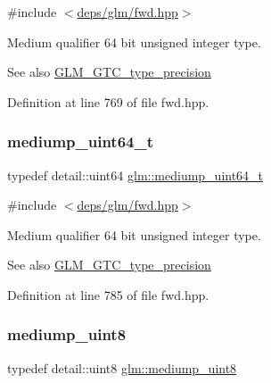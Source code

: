 {\ttfamily \#include $<$\hyperlink{fwd_8hpp}{deps/glm/fwd.\+hpp}$>$}

Medium qualifier 64 bit unsigned integer type. \begin{DoxySeeAlso}{See also}
\hyperlink{group__gtc__type__precision}{G\+L\+M\+\_\+\+G\+T\+C\+\_\+type\+\_\+precision} 
\end{DoxySeeAlso}


Definition at line 769 of file fwd.\+hpp.

\mbox{\label{group__gtc__type__precision_gaa97354d3120a6dc029a5e9563723de18}} 
\subsubsection{\texorpdfstring{mediump\+\_\+uint64\+\_\+t}{mediump\_uint64\_t}}
{\footnotesize\ttfamily typedef detail\+::uint64 \hyperlink{group__gtc__type__precision_gaa97354d3120a6dc029a5e9563723de18}{glm\+::mediump\+\_\+uint64\+\_\+t}}



{\ttfamily \#include $<$\hyperlink{fwd_8hpp}{deps/glm/fwd.\+hpp}$>$}

Medium qualifier 64 bit unsigned integer type. \begin{DoxySeeAlso}{See also}
\hyperlink{group__gtc__type__precision}{G\+L\+M\+\_\+\+G\+T\+C\+\_\+type\+\_\+precision} 
\end{DoxySeeAlso}


Definition at line 785 of file fwd.\+hpp.

\mbox{\label{group__gtc__type__precision_gac4b849eaac0543a10f97f4bdda4850a8}} 
\subsubsection{\texorpdfstring{mediump\+\_\+uint8}{mediump\_uint8}}
{\footnotesize\ttfamily typedef detail\+::uint8 \hyperlink{group__gtc__type__precision_gac4b849eaac0543a10f97f4bdda4850a8}{glm\+::mediump\+\_\+uint8}}



